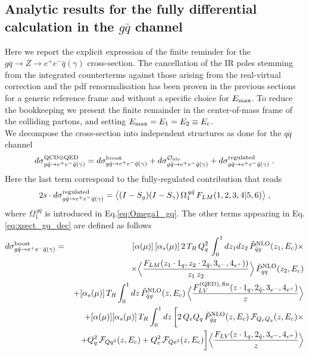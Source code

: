 \documentclass[12pt,a4paper]{article}
\newcommand{\nn}{\nonumber}
\newcommand{\beq}{\begin{eqnarray}}
\newcommand{\eeq}{\end{eqnarray}}
\newcommand{\barq}{{\bar{q}}}
\begin{document}
\subsection{Analytic results for the fully differential calculation in the $g\bar{q}$ channel}
Here we report the explicit expression of the finite reminder for the $g\bar{q} \rightarrow Z \rightarrow e^+e^- \barq(\gamma)$ cross-section.
The cancellation of the IR poles stemming from the integrated counterterms against those arising from the real-virtual correction and the pdf renormalisation
has been proven in the previous sections for a generic reference frame and without a specific choice for $E_{\rm max}$. 
To reduce the bookkeeping we present the finite remainder in the center-of-mass frame of the colliding partons, and setting  $E_{\rm max}=E_1=E_2\equiv E_c$. \\
We decompose the cross-section into independent structures as done for the $q\barq$ channel 
\beq
d \sigma^{\rm QCD \otimes QED}_{g\bar{q} \rightarrow e^+e^-\barq(\gamma)}
=
d \sigma^{\rm boost}_{g\bar{q} \rightarrow e^+e^-\barq(\gamma)}
+
d \sigma^{\mathcal{O}_{\rm nlo}}_{g\bar{q} \rightarrow e^+e^-\barq(\gamma)}
+
d \sigma^{\rm regulated}_{g\bar{q} \rightarrow e^+e^-\barq(\gamma)} \; .
\label{eq:xsect_gq_dec}
\eeq
Here the last term correspond to the fully-regulated contribution that reads
\beq
2s\cdot d \sigma^{\rm regulated}_{g\bar{q} \rightarrow e^+e^-\barq(\gamma)}
=
\big\langle (I-S_g) (I-S_\gamma) \, \Omega^{\, g\bar{q}}_1 \, F_{LM}(1,2,3,4|5,6)\big\rangle \; ,
\eeq
where $\Omega^{\, g\bar{q}}_1$ is introduced in Eq.\eqref{eq:Omega1_gq}. The other terms appearing in Eq.\eqref{eq:xsect_gq_dec}
are defined as follows
\beq
d \sigma^{\rm boost}_{g\bar{q} \rightarrow e^+e^-\barq(\gamma)}
&=&
[\alpha(\mu)] \, [\alpha_s(\mu)] \, 
2 \, T_R \, Q_q^2 \, 
\int_0^1 dz_1 dz_2 \,\tilde{P}^{\rm NLO}_{\bar{q}g} (z_1, E_c)
\times
\nn \\
&& \qquad \qquad \times 
 \Big\langle \frac{F_{LM} (z_1 \cdot 1_{q},z_2 \cdot 2_{\bar{q}},3_{e^-},4_{e^+}))}{z_1 \, z_2} \Big\rangle \, 
 \tilde{P}_{qq}^{\rm NLO} (z_2, E_c)
 \nn \\
 &&
 +
[\alpha_{s}(\mu)] \,T_R 
\int_{0}^1 dz \, 
\tilde{P}^{\rm NLO}_{\bar{q}g} (z, E_c) \, \Big\langle
 \frac{F_{LV}^{\rm (QED), \, fin}(z \cdot 1_{q},2_{\bar{q}},3_{e^-},4_{e^+})}{z} \Big\rangle
 \nn \\
 &&
  +
[\alpha(\mu)] [\alpha_{s}(\mu)] \,T_R 
\int_{0}^1 dz \, 
\bigg[
2 \, Q_e Q_q \, 
\tilde{P}^{\rm NLO}_{\bar{q}g} (z, E_c) \,
\mathcal{F}_{Q_eQ_q}(z, E_c)
\times
\nn \\
&& \quad 
+
Q_q^2 \, \mathcal{F}_{Qq^2}(z, E_c)
+
Q_e^2 \, \mathcal{F}_{Qe^2}(z, E_c)
\bigg]
 \Big\langle
 \frac{F_{LV}(z \cdot 1_{q},2_{\bar{q}},3_{e^-},4_{e^+})}{z} \Big\rangle
\eeq
\bigskip
\end{document}
